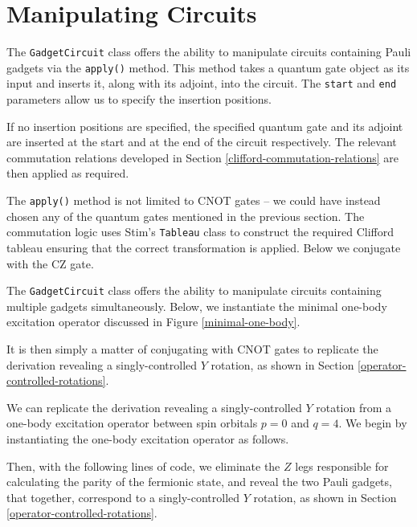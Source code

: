 \section{Manipulating Circuits}%
\label{manipulating-circuits}

The \lstinline{GadgetCircuit} class offers the ability to manipulate circuits containing Pauli gadgets via the \lstinline{apply()} method. This method takes a quantum gate object as its input and inserts it, along with its adjoint, into the circuit. The \lstinline{start} and \lstinline{end} parameters allow us to specify the insertion positions.


If no insertion positions are specified, the specified quantum gate and its adjoint are inserted at the start and at the end of the circuit respectively. The relevant commutation relations developed in Section \ref{clifford-commutation-relations} are then applied as required.


The \lstinline{apply()} method is not limited to CNOT gates -- we could have instead chosen any of the quantum gates mentioned in the previous section. The commutation logic uses Stim's \lstinline{Tableau} class to construct the required Clifford tableau ensuring that the correct transformation is applied. Below we conjugate with the CZ gate.


The \lstinline{GadgetCircuit} class offers the ability to manipulate circuits containing multiple gadgets simultaneously. Below, we instantiate the minimal one-body excitation operator discussed in Figure \ref{minimal-one-body}.


It is then simply a matter of conjugating with CNOT gates to replicate the derivation revealing a singly-controlled $Y$ rotation, as shown in Section \ref{operator-controlled-rotations}.


We can replicate the derivation revealing a singly-controlled $Y$ rotation from a one-body excitation operator between spin orbitals $p=0$ and $q=4$. We begin by instantiating the one-body excitation operator as follows.


Then, with the following lines of code, we eliminate the $Z$ legs responsible for calculating the parity of the fermionic state, and reveal the two Pauli gadgets, that together, correspond to a singly-controlled $Y$ rotation, as shown in Section \ref{operator-controlled-rotations}.

